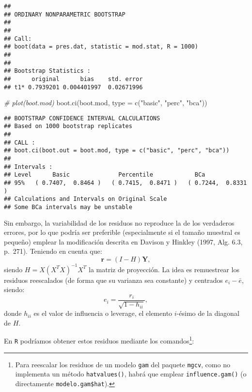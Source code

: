 \documentclass[
]{book}
\newenvironment{Shaded}{\begin{snugshade}}{\end{snugshade}}
\newcommand{\AttributeTok}[1]{\textcolor[rgb]{0.77,0.63,0.00}{#1}}
\newcommand{\CommentTok}[1]{\textcolor[rgb]{0.56,0.35,0.01}{\textit{#1}}}
\newcommand{\DecValTok}[1]{\textcolor[rgb]{0.00,0.00,0.81}{#1}}
\newcommand{\FunctionTok}[1]{\textcolor[rgb]{0.00,0.00,0.00}{#1}}
\newcommand{\NormalTok}[1]{#1}
\newcommand{\OtherTok}[1]{\textcolor[rgb]{0.56,0.35,0.01}{#1}}
\newcommand{\SpecialCharTok}[1]{\textcolor[rgb]{0.00,0.00,0.00}{#1}}
\newcommand{\StringTok}[1]{\textcolor[rgb]{0.31,0.60,0.02}{#1}}
\theoremstyle{break}
\theoremstyle{definition}
\theoremstyle{definition}
\theoremstyle{definition}
\theoremstyle{definition}
\theoremstyle{remark}
\begin{document}
\begin{verbatim}
## 
## ORDINARY NONPARAMETRIC BOOTSTRAP
## 
## 
## Call:
## boot(data = pres.dat, statistic = mod.stat, R = 1000)
## 
## 
## Bootstrap Statistics :
##      original      bias    std. error
## t1* 0.7939201 0.004401997  0.02671996
\end{verbatim}

\begin{Shaded}
\begin{Highlighting}[]
\CommentTok{\# plot(boot.mod)}
\FunctionTok{boot.ci}\NormalTok{(boot.mod, }\AttributeTok{type =} \FunctionTok{c}\NormalTok{(}\StringTok{"basic"}\NormalTok{, }\StringTok{"perc"}\NormalTok{, }\StringTok{"bca"}\NormalTok{))}
\end{Highlighting}
\end{Shaded}

\begin{verbatim}
## BOOTSTRAP CONFIDENCE INTERVAL CALCULATIONS
## Based on 1000 bootstrap replicates
## 
## CALL : 
## boot.ci(boot.out = boot.mod, type = c("basic", "perc", "bca"))
## 
## Intervals : 
## Level      Basic              Percentile            BCa          
## 95%   ( 0.7407,  0.8464 )   ( 0.7415,  0.8471 )   ( 0.7244,  0.8331 )  
## Calculations and Intervals on Original Scale
## Some BCa intervals may be unstable
\end{verbatim}

Sin embargo, la variabilidad de los residuos no reproduce la de los verdaderos errores, por lo que podría ser preferible (especialmente si el tamaño muestral es pequeño) emplear la modificación descrita en Davison y Hinkley (1997, Alg. 6.3, p.~271).
Teniendo en cuenta que:
\[\mathbf{r} = \left( I - H \right)\mathbf{Y},\]
siendo \(H = X\left( X^{T}X\right)^{-1}X^{T}\) la matriz de proyección.
La idea es remuestrear los residuos reescalados (de forma que su varianza sea constante) y centrados \(e_i - \bar{e}\), siendo:
\[e_i = \frac{r_i}{\sqrt{1 - h_{ii}}},\]
donde \(h_{ii}\) es el valor de influencia o leverage, el elemento \(i\)-ésimo de la diagonal de \(H\).

En \texttt{R} podríamos obtener estos residuos mediante los comandos\footnote{Para reescalar los
  residuos de un modelo \texttt{gam} del paquete \texttt{mgcv}, como no implementa un método \texttt{hatvalues()},
  habrá que emplear \texttt{influence.gam()} (o directamente \texttt{modelo.gam\$hat}).}:

\begin{Shaded}
\end{Shaded}
\end{document}
